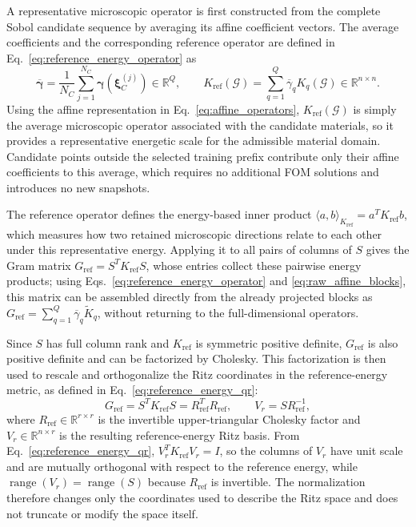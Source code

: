\documentclass[pdflatex,sn-basic,Numbered]{sn-jnl}
\newcommand{\R}{\mathbb{R}}
\newcommand{\G}{\mathcal{G}}
\begin{document}
A representative microscopic operator is first constructed from the complete
Sobol candidate sequence by averaging its affine coefficient vectors. The
average coefficients and the corresponding reference operator are defined in
Eq.~\eqref{eq:reference_energy_operator} as
\begin{equation}
\label{eq:reference_energy_operator}
\overline{\boldsymbol\gamma}
=
\frac{1}{N_C}
\sum_{j=1}^{N_C}
\boldsymbol\gamma(\boldsymbol\xi_C^{(j)})
\in\R^Q,
\qquad
K_{\mathrm{ref}}(\G)
=
\sum_{q=1}^{Q}
\overline{\gamma}_qK_q(\G)
\in\R^{n\times n}.
\end{equation}
Using the affine representation in Eq.~\eqref{eq:affine_operators},
\(K_{\mathrm{ref}}(\G)\) is simply the average microscopic operator associated
with the candidate materials, so it provides a representative energetic scale
for the admissible material domain. Candidate points outside the selected
training prefix contribute only their affine coefficients to this average,
which requires no additional FOM solutions and introduces no new snapshots.

The reference operator defines the energy-based inner product
\(\langle a,b\rangle_{K_{\mathrm{ref}}}=a^TK_{\mathrm{ref}}b\), which
measures how two retained microscopic directions relate to each other under
this representative energy. Applying it to all pairs of columns of \(S\)
gives the Gram matrix
\(G_{\mathrm{ref}}=S^TK_{\mathrm{ref}}S\), whose entries collect these
pairwise energy products; using
Eqs.~\eqref{eq:reference_energy_operator} and
\eqref{eq:raw_affine_blocks}, this matrix can be assembled directly from the
already projected blocks as
\(G_{\mathrm{ref}}
=\sum_{q=1}^{Q}\overline{\gamma}_q\widetilde K_q\), without returning to the
full-dimensional operators.

Since \(S\) has full column rank and \(K_{\mathrm{ref}}\) is symmetric
positive definite, \(G_{\mathrm{ref}}\) is also positive definite and can be
factorized by Cholesky. This factorization is then used to rescale and
orthogonalize the Ritz coordinates in the reference-energy metric, as defined
in Eq.~\eqref{eq:reference_energy_qr}:
\begin{equation}
\label{eq:reference_energy_qr}
G_{\mathrm{ref}}
=
S^TK_{\mathrm{ref}}S
=
R_{\mathrm{ref}}^TR_{\mathrm{ref}},
\qquad
V_r
=
SR_{\mathrm{ref}}^{-1},
\end{equation}
where \(R_{\mathrm{ref}}\in\R^{r\times r}\) is the invertible
upper-triangular Cholesky factor and
\(V_r\in\R^{n\times r}\) is the resulting reference-energy Ritz basis. From
Eq.~\eqref{eq:reference_energy_qr},
\(V_r^TK_{\mathrm{ref}}V_r=I\), so the columns of \(V_r\) have unit scale and
are mutually orthogonal with respect to the reference energy, while
\(\operatorname{range}(V_r)=\operatorname{range}(S)\) because
\(R_{\mathrm{ref}}\) is invertible. The normalization therefore changes only
the coordinates used to describe the Ritz space and does not truncate or
modify the space itself.
\end{document}
